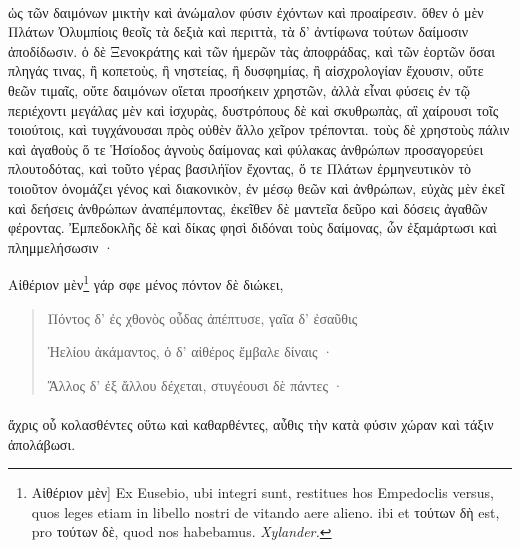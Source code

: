 \documentclass[a4paper, 11pt, oneside, polutonikogreek, german, landscape]{article}
\begin{document}
\paragraph{}
ὡς τῶν δαιμόνων μικτὴν καὶ ἀνώμαλον φύσιν ἐχόντων καὶ προαίρεσιν. ὅθεν ὁ μὲν Πλάτων Ὀλυμπίοις θεοῖς τὰ δεξιὰ καὶ περιττὰ, τὰ δ' ἀντίφωνα τούτων δαίμοσιν ἀποδίδωσιν. ὁ δὲ Ξενοκράτης καὶ τῶν ἡμερῶν τὰς ἀποφράδας, καὶ τῶν ἑορτῶν ὅσαι πληγάς τινας, ἢ κοπετοὺς, ἢ νηστείας, ἢ δυσφημίας, ἢ αἰσχρολογίαν ἔχουσιν, οὔτε θεῶν τιμαῖς, οὔτε δαιμόνων οἴεται προσήκειν χρηστῶν, ἀλλὰ εἶναι φύσεις ἐν τῷ περιέχοντι μεγάλας μὲν καὶ ἰσχυρὰς, δυστρόπους δὲ καὶ σκυθρωπὰς, αἳ χαίρουσι τοῖς τοιούτοις, καὶ τυγχάνουσαι πρὸς οὐθὲν ἄλλο χεῖρον τρέπονται. τοὺς δὲ χρηστοὺς πάλιν καὶ ἀγαθοὺς ὅ τε Ἡσίοδος ἁγνοὺς δαίμονας καὶ φύλακας ἀνθρώπων προσαγορεύει πλουτοδότας, καὶ τοῦτο γέρας βασιλήϊον ἔχοντας, ὅ τε Πλάτων ἑρμηνευτικὸν τὸ τοιοῦτον ὀνομάζει γένος καὶ διακονικὸν, ἐν μέσῳ θεῶν καὶ ἀνθρώπων, εὐχὰς μὲν ἐκεῖ καὶ δεήσεις ἀνθρώπων ἀναπέμποντας, ἐκεῖθεν δὲ μαντεῖα δεῦρο καὶ δόσεις ἀγαθῶν φέροντας. Ἐμπεδοκλῆς δὲ καὶ δίκας φησὶ διδόναι τοὺς δαίμονας, ὧν ἐξαμάρτωσι καὶ πλημμελήσωσιν ·

Αἰθέριον μὲν\footnote{Αἰθέριον μὲν] Ex Eusebio, ubi integri sunt, restitues hos Empedoclis versus, quos leges etiam in libello nostri de vitando aere alieno. ibi et τούτων δὴ est, pro τούτων δὲ, quod nos habebamus. \emph{Xylander.}} γάρ σφε μένος πόντον δὲ διώκει,
\begin{quotation}\small
Πόντος δ' ἐς χθονὸς οὖδας ἀπέπτυσε, γαῖα δ' ἐσαῦθις

Ἠελίου ἀκάμαντος, ὁ δ' αἰθέρος ἔμβαλε δίναις ·

Ἄλλος δ' ἐξ ἄλλου δέχεται, στυγέουσι δὲ πάντες ·
\end{quotation}
\paragraph{}
ἄχρις οὗ κολασθέντες οὕτω καὶ καθαρθέντες, αὖθις τὴν κατὰ φύσιν χώραν καὶ τάξιν ἀπολάβωσι.
\end{document}
